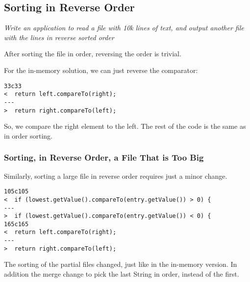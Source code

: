\subsection{Sorting in Reverse Order}
\textit{Write an application to read a file with 10k lines of text, and output another file with the lines in reverse sorted order}

After sorting the file in order, reversing the order is trivial.

For the in-memory solution, we can just reverse the comparator:

\begin{lstlisting}
33c33
<  return left.compareTo(right);
---
>  return right.compareTo(left);

\end{lstlisting}
So, we compare the right element to the left. The rest of the code is the same as in order sorting.

\subsubsection{Sorting, in Reverse Order, a File That is Too Big}
Similarly, sorting a large file in reverse order requires just a minor change.

\begin{lstlisting}
105c105
<  if (lowest.getValue().compareTo(entry.getValue()) > 0) {
---
>  if (lowest.getValue().compareTo(entry.getValue()) < 0) {
165c165
<  return left.compareTo(right);
---
>  return right.compareTo(left);

\end{lstlisting}

The sorting of the partial files changed, just like in the in-memory version. In addition the merge change to pick the last String in order, instead of the first.